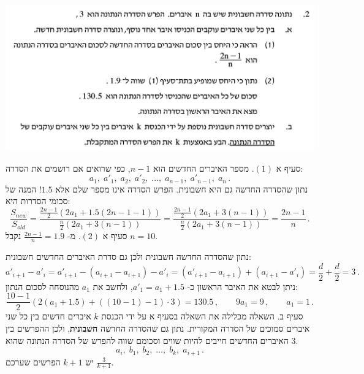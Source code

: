 \documentclass[12pt,a4paper]{article}
\begin{document}
\begin{center}
\includegraphics[width=.95\textwidth]{summer-2016b-2}
\end{center}
\vspace{-1ex}
סעיף א
$(1)$.
מספר האיברים החדשים הוא
$n-1$,
כפי שרואים אם רושמים את הסדרה:
\[
a_1,\; a'_1,\; a_2,\; a'_2,\; \ldots,\; a_{n-1},\; a'_{n-1},\; a_n\,.
\]
נתון שהסדרה החדשה גם היא חשבונית. הפרש הסדרה אינו מספר שלם אלא
$1.5$!
המנה של סכומי הסדרות היא:
\[
\frac{S_{\mathit{new}}}{S_{\mathit{old}}}= \frac{\displaystyle\frac{2n-1}{2}(2a_1+1.5(2n-1-1))}{\displaystyle\frac{n}{2}(2a_1+3(n-1))}=\frac{\displaystyle\frac{2n-1}{2}(2a_1+3(n-1))}{\displaystyle\frac{n}{2}(2a_1+3(n-1))}=\frac{2n-1}{n}\,.
\]
סעיף א
$(2)$.
מ-%
$\displaystyle\frac{2n-1}{n}=1.9$
נקבל
$n=10$.

נתון שהסדרה החדשה חשבונית ולכן גם סדרת האיברים החדשים חשבונית:
\[
a'_{i+1}-a'_{i}=a'_{i+1}-(a_{i+1}-a_{i+1})-a'_i=(a'_{i+1}-a_{i+1})+(a_{i+1}-a'_i)=\frac{d}{2}+\frac{d}{2}=3\,.
\]
ניתן לבטא את האיבר הראשון כ-%
$a'_1=a_1+1.5$,
ולחשב את
$a_1$
מהנוסחה לסכום הנתון:
\[
\frac{10-1}{2}(2(a_1+1.5)+((10-1)-1)\cdot 3) = 130.5\,,\quad\quad 9a_1=9\,,\quad\quad a_1=1\,.
\]
סעיף ב. השאלה מכלילה את השאלה בסעיף א על ידי הכנסת
$k$
איברים חדשים בין כל שני איברים סמוכים של הסדרה המקורית. נתון גם שהסדרה החדשה
\textbf{חשבונית},
ולכן ההפרשים בין האיברים החדשים חייבים להיות שווים וסכומם שווה להפרש של הסדרה הנתונה שהוא
$3$.
\[
a_i,\; b_1,\; b_2,\; \ldots,\; b_k,\; a_{i+1}\,.
\]
יש
$k+1$
הפרשים שערכם
$\displaystyle\frac{3}{k+1}$.

\bigskip

\textbf{}
\end{document}
